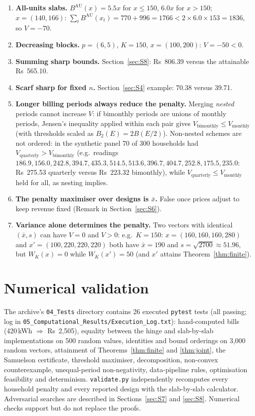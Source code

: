\documentclass[11pt,a4paper]{article}
\theoremstyle{definition}
\theoremstyle{plain}\newtheorem{sprop}{Proposition}[section]\newtheorem{slemma}[sprop]{Lemma}\newtheorem{scor}[sprop]{Corollary}
\theoremstyle{definition}
\theoremstyle{remark}
\newcommand{\xbar}{\bar{x}}
\numberwithin{equation}{section}
\begin{document}
\begin{enumerate}
\item \textbf{All-units slabs.} $B^{\mathrm{AU}}(x)=5.5x$ for $x\le150$, $6.0x$ for $x>150$; $x=(140,166)$: $\sum_tB^{\mathrm{AU}}(x_t)=770+996=1766<2\times6.0\times153=1836$, so $V=-70$.
\item \textbf{Decreasing blocks.} $p=(6,5)$, $K=150$, $x=(100,200)$: $V=-50<0$.
\item \textbf{Summing sharp bounds.} Section~\ref{sec:S8}: Rs~806.39 versus the attainable Rs~565.10.
\item \textbf{Scarf sharp for fixed $n$.} Section~\ref{sec:S4} example: 70.38 versus 39.71.
\item \textbf{Longer billing periods always reduce the penalty.} Merging \emph{nested} periods cannot increase $V$: if bimonthly periods are unions of monthly periods, Jensen's inequality applied within each pair gives $V_{\text{bimonthly}}\le V_{\text{monthly}}$ (with thresholds scaled as $B_2(E)=2B(E/2)$). Non-nested schemes are not ordered: in the synthetic panel 70 of 300 households had $V_{\text{quarterly}}>V_{\text{bimonthly}}$ (e.g.\ readings $186.9,156.0,242.8,394.7,435.3,514.5,513.6,396.7,404.7,252.8,175.5,235.0$: Rs~275.53 quarterly versus Rs~223.32 bimonthly), while $V_{\text{quarterly}}\le V_{\text{monthly}}$ held for all, as nesting implies.
\item \textbf{The penalty maximiser over designs is $\xbar$.} False once prices adjust to keep revenue fixed (Remark in Section~\ref{sec:S6}).
\item \textbf{Variance alone determines the penalty.} Two vectors with identical $(\xbar,s)$ can have $V=0$ and $V>0$: e.g.\ $K=150$: $x=(160,160,160,280)$ and $x'=(100,220,220,220)$ both have $\xbar=190$ and $s=\sqrt{2700}\approx51.96$, but $W_K(x)=0$ while $W_K(x')=50$ (and $x'$ attains Theorem~\ref{thm:finite}).
\end{enumerate}

\section{Numerical validation}\label{sec:S12}

The archive's \texttt{04\_Tests} directory contains 26 executed \texttt{pytest} tests (all passing; log in \texttt{05\_Computational\_Results/Execution\_Log.txt}): hand-computed bills (420\,kWh $\Rightarrow$ Rs~2{,}505), equality between the hinge and slab-by-slab implementations on 500 random values, identities and bound orderings on 3{,}000 random vectors, attainment of Theorems~\ref{thm:finite} and \ref{thm:joint}, the Samuelson certificate, threshold maximiser, decomposition, non-convex counterexample, unequal-period non-negativity, data-pipeline rules, optimisation feasibility and determinism. \texttt{validate.py} independently recomputes every household penalty and every reported design with the slab-by-slab calculator. Adversarial searches are described in Sections~\ref{sec:S7} and \ref{sec:S8}. Numerical checks support but do not replace the proofs.
\end{document}
